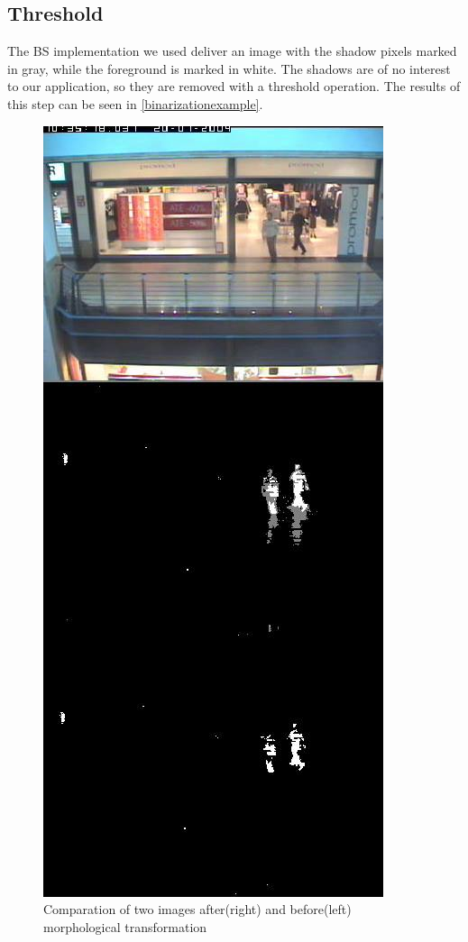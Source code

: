 \documentclass[10pt, conference]{IEEEtran}
\begin{document}
	\subsection{Threshold}
	The BS implementation we used deliver an image with the shadow pixels marked in gray, while the foreground is marked in white. The shadows are of no interest to our application, so they are removed with a threshold operation. The results of this step can be seen in \autoref{binarizationexample}.
	\begin{figure}[H]
		\centering
		\includegraphics[height=0.5\textheight]{figs/binarizationexample}
		\caption{Comparation of two images after(right) and before(left) morphological transformation}
		\label{binarizationexample}
	\end{figure}
	
\end{document}

